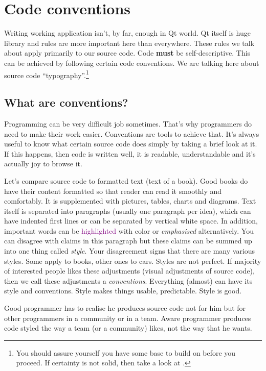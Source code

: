 \section{Code conventions}
Writing working application isn't, by far, enough in Qt world. Qt itself is huge library and rules are more important here than everywhere. These rules we talk about apply primarily to our source code. Code \textbf{must} be self-descriptive. This can be achieved by following certain code conventions. We are talking here about source code \enquote{typography}.\footnote{You should assure yourself you have some base to build on before you proceed. If certainty is not solid, then take a look at \citep[p.~40-77]{mcconnell:codecomplete}.}

\subsection{What are conventions?}
Programming can be very difficult job sometimes. That's why programmers do need to make their work easier. Conventions are tools to achieve that. It's always useful to know what certain source code does simply by taking a brief look at it. If this happens, then code is written well, it is readable, understandable and it's actually joy to browse it.

Let's compare source code to formatted text (\eg  text of a book). Good books do have their content formatted so that reader can read it smoothly and comfortably. It is supplemented with pictures, tables, charts and diagrams. Text itself is separated into paragraphs (usually one paragraph per idea), which can have indented first lines or can be separated by vertical white space. In addition, important words can be \textcolor{purple}{highlighted} with color or \emph{emphasised} alternatively. You can disagree with claims in this paragraph but these claims can be summed up into one thing called \emph{style}. Your disagreement signs that there are many various styles. Some apply to books, other ones to cars. Styles are not perfect. If majority of interested people likes these adjustments (\eg visual adjustments of source code), then we call these adjustments a \emph{conventions}. Everything (almost) can have its style and conventions. Style makes things usable, predictable. Style 
is good.

Good programmer has to realise he produces source code not for him but for other programmers in a community or in a team. Aware programmer produces code styled the way a team (or a community) likes, not the way that he wants.

